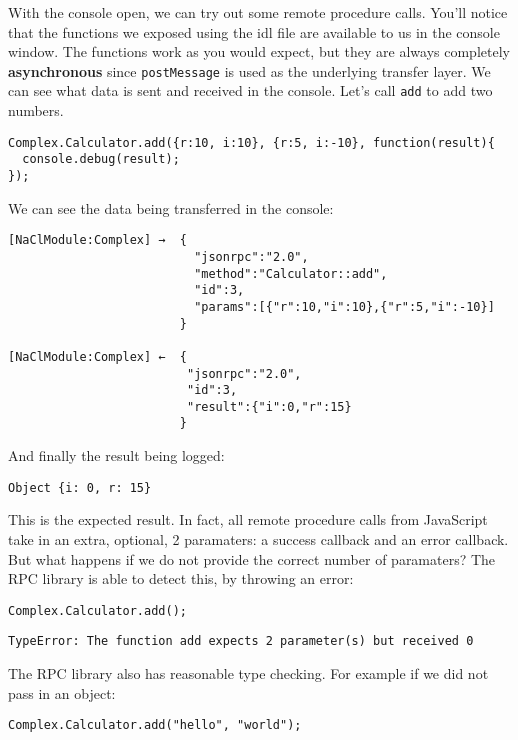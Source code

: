 With the console open, we can try out some remote procedure calls.
You'll notice that the functions we exposed using the idl file are
available to us in the console window. The functions work as you would
expect, but they are always completely \textbf{asynchronous} since
\texttt{postMessage} is used as the underlying transfer layer. We can
see what data is sent and received in the console. Let's call
\texttt{add} to add two numbers.

\begin{verbatim}
Complex.Calculator.add({r:10, i:10}, {r:5, i:-10}, function(result){
  console.debug(result);
});
\end{verbatim}

We can see the data being transferred in the console:

\begin{verbatim}
[NaClModule:Complex] →  {
                          "jsonrpc":"2.0",
                          "method":"Calculator::add",
                          "id":3,
                          "params":[{"r":10,"i":10},{"r":5,"i":-10}]
                        }

[NaClModule:Complex] ←  {
                         "jsonrpc":"2.0",
                         "id":3,
                         "result":{"i":0,"r":15}
                        }
\end{verbatim}

And finally the result being logged:

\begin{verbatim}
Object {i: 0, r: 15}
\end{verbatim}

This is the expected result. In fact, all remote procedure calls from
JavaScript take in an extra, optional, 2 paramaters: a success callback
and an error callback. But what happens if we do not provide the correct
number of paramaters? The RPC library is able to detect this, by
throwing an error:

\begin{verbatim}
Complex.Calculator.add();
\end{verbatim}

\begin{verbatim}
TypeError: The function add expects 2 parameter(s) but received 0
\end{verbatim}

The RPC library also has reasonable type checking. For example if we did
not pass in an object:

\begin{verbatim}
Complex.Calculator.add("hello", "world");
\end{verbatim}

